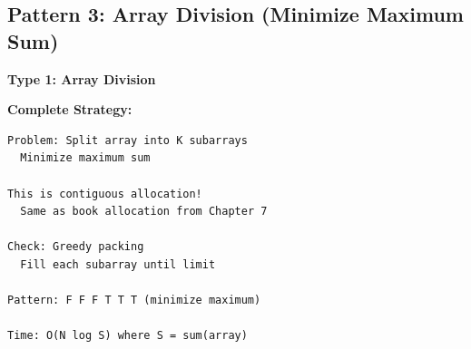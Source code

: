 \documentclass[11pt,a4paper,oneside]{book}
\begin{document}
\subsection{Pattern 3: Array Division (Minimize Maximum Sum)}

\begin{tcolorbox}[
    enhanced,breakable,
    colback=warnyellow!10,
    colframe=warnyellow,
    boxrule=2pt,
    arc=4mm,
    title=\textbf{Complete Array Division Algorithms}
]
\textbf{Type 1: Array Division}

\textbf{Complete Strategy:}
\begin{verbatim}
Problem: Split array into K subarrays
  Minimize maximum sum
  
This is contiguous allocation!
  Same as book allocation from Chapter 7

Check: Greedy packing
  Fill each subarray until limit

Pattern: F F F T T T (minimize maximum)

Time: O(N log S) where S = sum(array)
\end{verbatim}
\end{tcolorbox}
\end{document}
